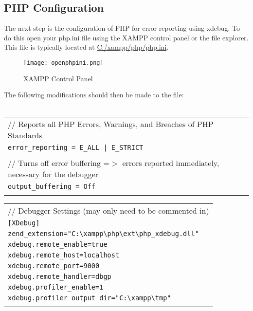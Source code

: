 \newpage
\subsection{PHP Configuration}
\label{subsec:phpconfig}

The next step is the configuration of PHP for error reporting using xdebug. To do this open your php.ini file using the XAMPP control panel or the file explorer. This file is typically located at \url{C:/xampp/php/php.ini}.\\

\begin{figure}[h] 
	\centering
	\texttt{[image: openphpini.png]}
	\caption{XAMPP Control Panel}
	\label{fig:xamppcontrolpanel}
\end{figure}

The following modifications should then be made to the file:\\
\\

\begin{tabular}{l}
	// Reports all PHP Errors, Warnings, and Breaches of PHP Standards\\
	\texttt{error\_reporting = E\_ALL | E\_STRICT}\\\\
	
	// Turns off error buffering =$>$ errors reported immediately, necessary for the debugger\\
	\texttt{output\_buffering = Off} \\\\
\end{tabular}

\label{xdebug_config}
\begin{tabular}{l}
	// Debugger Settings (may only need to be commented in)\\
	\texttt{[XDebug]} \\
	\texttt{zend\_extension="C:\textbackslash xampp\textbackslash php\textbackslash ext\textbackslash php\_xdebug.dll"}\\
	\texttt{xdebug.remote\_enable=true}\\
	\texttt{xdebug.remote\_host=localhost}\\
	\texttt{xdebug.remote\_port=9000}\\
	\texttt{xdebug.remote\_handler=dbgp}\\
	\texttt{xdebug.profiler\_enable=1}\\
	\texttt{xdebug.profiler\_output\_dir="C:\textbackslash xampp\textbackslash tmp"}\\\\
\end{tabular}

